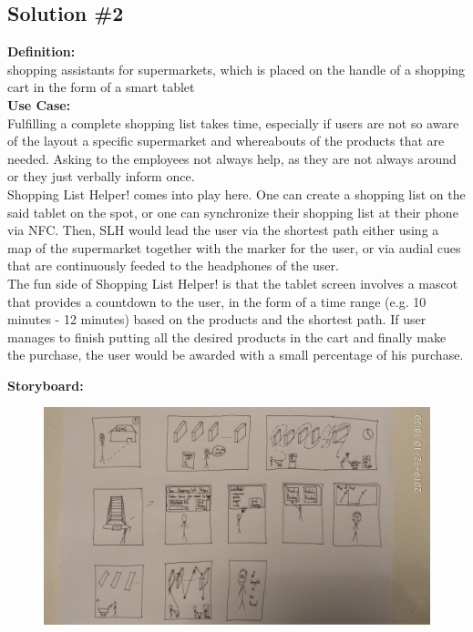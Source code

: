 \documentclass[a4paper,10pt,oneside]{scrreprt}
\begin{document}
		\clearpage
		\subsection{Solution \#2}

			\noindent \textbf{Definition:}\\
			shopping assistants for supermarkets, which is placed on the handle of a shopping cart in the form of a smart tablet\\

			\noindent \textbf{Use Case:}\\
			Fulfilling a complete shopping list takes time, especially if users are not so aware of the layout a specific supermarket and whereabouts of the products that are needed. Asking to the employees not always help, as they are not always around or they just verbally inform once.\\

			Shopping List Helper! comes into play here. One can create a shopping list on the said tablet on the spot, or one can synchronize their shopping list at their phone via NFC. Then, SLH would lead the user via the shortest path either using a map of the supermarket together with the marker for the user, or via audial cues that are continuously feeded to the headphones of the user.\\

			The fun side of Shopping List Helper! is that the tablet screen involves a mascot that provides a countdown to the user, in the form of a time range (e.g. 10 minutes - 12 minutes) based on the products and the shortest path. If user manages to finish putting all the desired products in the cart and finally make the purchase, the user would be awarded with a small percentage of his purchase.

			\noindent \textbf{Storyboard:}\\

			\begin{figure}[h]
				\centering
				\includegraphics[scale=0.16, clip, trim={45em 0em 45em 0em}]{images/s1.jpg}
			\end{figure}
\end{document}
